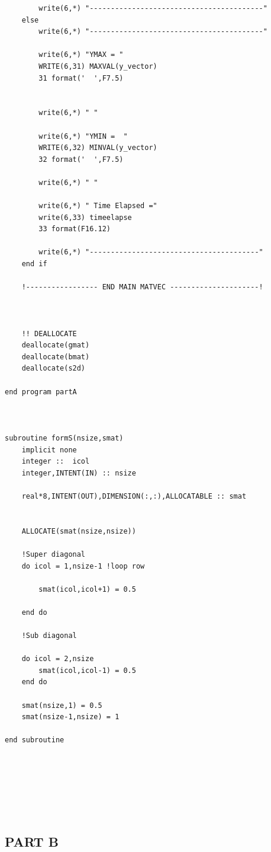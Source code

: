 \documentclass[12pt]{article}
\begin{document}
\begin{lstlisting}
        write(6,*) "-----------------------------------------"
    else
        write(6,*) "-----------------------------------------"

        write(6,*) "YMAX = "
        WRITE(6,31) MAXVAL(y_vector)
        31 format('  ',F7.5)


        write(6,*) " "

        write(6,*) "YMIN =  "
        WRITE(6,32) MINVAL(y_vector)
        32 format('  ',F7.5)

        write(6,*) " "

        write(6,*) " Time Elapsed ="
        write(6,33) timeelapse
        33 format(F16.12)

        write(6,*) "----------------------------------------"
    end if

    !----------------- END MAIN MATVEC ---------------------!



    !! DEALLOCATE 
    deallocate(gmat)
    deallocate(bmat)
    deallocate(s2d)
    
end program partA 



subroutine formS(nsize,smat)
    implicit none
    integer ::  icol
    integer,INTENT(IN) :: nsize
    
    real*8,INTENT(OUT),DIMENSION(:,:),ALLOCATABLE :: smat


    ALLOCATE(smat(nsize,nsize))

    !Super diagonal
    do icol = 1,nsize-1 !loop row
       
        smat(icol,icol+1) = 0.5
      
    end do

    !Sub diagonal

    do icol = 2,nsize
        smat(icol,icol-1) = 0.5
    end do
   
    smat(nsize,1) = 0.5
    smat(nsize-1,nsize) = 1

end subroutine







   \end{lstlisting}



   \newpage
   \subsection{PART B}
\end{document}
